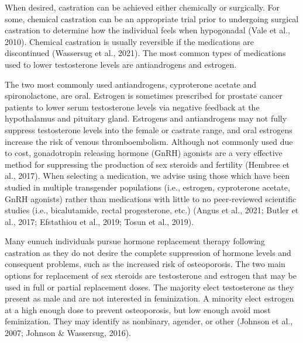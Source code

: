 \documentclass[
]{book}
\begin{document}
When desired, castration can be achieved
either chemically or surgically. For some, chemical castration can be an appropriate trial prior
to undergoing surgical castration to determine
how the individual feels when hypogonadal (Vale
et al., 2010). Chemical castration is usually
reversible if the medications are discontinued
(Wassersug et al., 2021). The most common types
of medications used to lower testosterone levels
are antiandrogens and estrogen.

The two most commonly used antiandrogens,
cyproterone acetate and spironolactone, are oral.
Estrogen is sometimes prescribed for prostate
cancer patients to lower serum testosterone levels
via negative feedback at the hypothalamus and
pituitary gland. Estrogens and antiandrogens may
not fully suppress testosterone levels into the
female or castrate range, and oral estrogens
increase the risk of venous thromboembolism.
Although not commonly used due to cost, gonadotropin releasing hormone (GnRH) agonists are
a very effective method for suppressing the production of sex steroids and fertility (Hembree
et al., 2017). When selecting a medication, we
advise using those which have been studied in
multiple transgender populations (i.e., estrogen,
cyproterone acetate, GnRH agonists) rather than
medications with little to no peer-reviewed scientific studies (i.e., bicalutamide, rectal progesterone, etc.) (Angus et al., 2021; Butler et al.,
2017; Efstathiou et al., 2019; Tosun et al., 2019).

Many eunuch individuals pursue hormone
replacement therapy following castration as they
do not desire the complete suppression of hormone levels and consequent problems, such as
the increased risk of osteoporosis. The two main
options for replacement of sex steroids are testosterone and estrogen that may be used in full
or partial replacement doses. The majority elect
testosterone as they present as male and are not
interested in feminization. A minority elect estrogen at a high enough dose to prevent osteoporosis, but low enough avoid most feminization.
They may identify as nonbinary, agender, or other
(Johnson et al., 2007; Johnson \& Wassersug, 2016).
\end{document}
